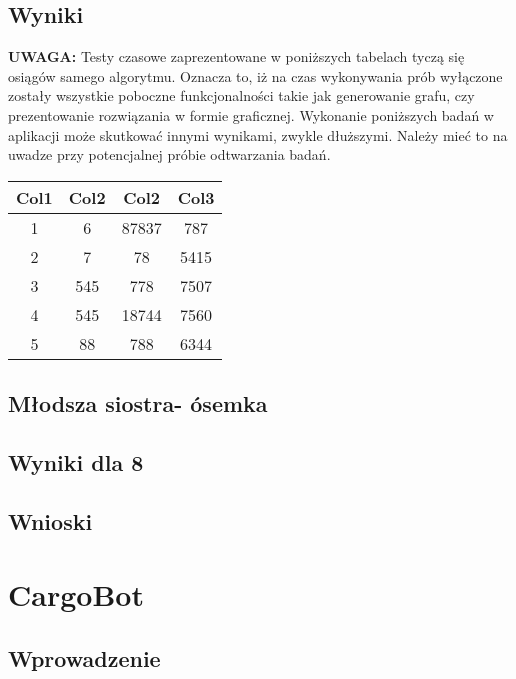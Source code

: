     \subsection{Wyniki}

    \textbf{UWAGA:} Testy czasowe zaprezentowane w poniższych tabelach tyczą się osiągów samego algorytmu. Oznacza to, iż na czas wykonywania prób
    wyłączone zostały wszystkie poboczne funkcjonalności takie jak generowanie grafu, czy prezentowanie rozwiązania w formie graficznej. 
    Wykonanie poniższych badań w aplikacji może skutkować innymi wynikami, zwykle dłuższymi. Należy mieć to na uwadze przy potencjalnej 
    próbie odtwarzania badań.

    \begin{table}[H]
        \centering
         \begin{tabular}{||c c c c||} 
         \hline
         Col1 & Col2 & Col2 & Col3 \\ [0.5ex] 
         \hline\hline
         1 & 6 & 87837 & 787 \\ 
         \hline
         2 & 7 & 78 & 5415 \\
         \hline
         3 & 545 & 778 & 7507 \\
         \hline
         4 & 545 & 18744 & 7560 \\
         \hline
         5 & 88 & 788 & 6344 \\ [1ex] 
         \hline
         \end{tabular}
    \end{table}

    



    \subsection{Młodsza siostra- ósemka}

    \subsection{Wyniki dla 8}
    \subsection{Wnioski}
\section{CargoBot}
    \subsection{Wprowadzenie}
        
